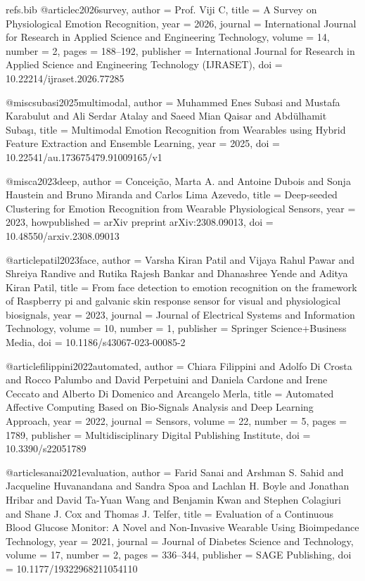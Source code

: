 \begin{filecontents*}[overwrite]{refs.bib}
@article{c2026survey,
  author = {Prof. Viji C},
  title = {{A Survey on Physiological Emotion Recognition}},
  year = {2026},
  journal = {International Journal for Research in Applied Science and Engineering Technology},
  volume = {14},
  number = {2},
  pages = {188--192},
  publisher = {International Journal for Research in Applied Science and Engineering Technology (IJRASET)},
  doi = {10.22214/ijraset.2026.77285}
}

@misc{subasi2025multimodal,
  author = {Muhammed Enes Subasi and Mustafa Karabulut and Ali Serdar Atalay and Saeed Mian Qaisar and Abd{\"u}lhamit Suba{\c{s}}{\i}},
  title = {{Multimodal Emotion Recognition from Wearables using Hybrid Feature Extraction and Ensemble Learning}},
  year = {2025},
  doi = {10.22541/au.173675479.91009165/v1}
}

@misc{a2023deep,
  author = {Concei{\c{c}}{\~a}o, Marta A. and Antoine Dubois and Sonja Haustein and Bruno Miranda and Carlos Lima Azevedo},
  title = {{Deep-seeded Clustering for Emotion Recognition from Wearable Physiological Sensors}},
  year = {2023},
  howpublished = {arXiv preprint arXiv:2308.09013},
  doi = {10.48550/arxiv.2308.09013}
}

@article{patil2023face,
  author = {Varsha Kiran Patil and Vijaya Rahul Pawar and Shreiya Randive and Rutika Rajesh Bankar and Dhanashree Yende and Aditya Kiran Patil},
  title = {{From face detection to emotion recognition on the framework of Raspberry pi and galvanic skin response sensor for visual and physiological biosignals}},
  year = {2023},
  journal = {Journal of Electrical Systems and Information Technology},
  volume = {10},
  number = {1},
  publisher = {Springer Science+Business Media},
  doi = {10.1186/s43067-023-00085-2}
}

@article{filippini2022automated,
  author = {Chiara Filippini and Adolfo Di Crosta and Rocco Palumbo and David Perpetuini and Daniela Cardone and Irene Ceccato and Alberto Di Domenico and Arcangelo Merla},
  title = {{Automated Affective Computing Based on Bio-Signals Analysis and Deep Learning Approach}},
  year = {2022},
  journal = {Sensors},
  volume = {22},
  number = {5},
  pages = {1789},
  publisher = {Multidisciplinary Digital Publishing Institute},
  doi = {10.3390/s22051789}
}

@article{sanai2021evaluation,
  author = {Farid Sanai and Arshman S. Sahid and Jacqueline Huvanandana and Sandra Spoa and Lachlan H. Boyle and Jonathan Hribar and David Ta-Yuan Wang and Benjamin Kwan and Stephen Colagiuri and Shane J. Cox and Thomas J. Telfer},
  title = {{Evaluation of a Continuous Blood Glucose Monitor: A Novel and Non-Invasive Wearable Using Bioimpedance Technology}},
  year = {2021},
  journal = {Journal of Diabetes Science and Technology},
  volume = {17},
  number = {2},
  pages = {336--344},
  publisher = {SAGE Publishing},
  doi = {10.1177/19322968211054110}
}


\end{filecontents*}
